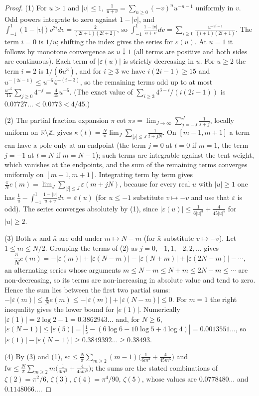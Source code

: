 \documentclass[11pt]{amsart}
\theoremstyle{definition}
\theoremstyle{remark}
\newcommand{\Z}{\mathbb{Z}}
\newcommand{\R}{\mathbb{R}}
\newcommand{\kb}{\bar\kappa}
\newcommand{\sprod}{\mathrm{sc}}
\newcommand{\fw}{\mathrm{fw}}
\begin{document}
\begin{proof}
(1) For $u>1$ and $|v|\le1$, $\frac1{u+v}=\sum_{n\ge0}(-v)^nu^{-n-1}$ uniformly in $v$. Odd powers integrate to zero
against $1-|v|$, and $\int_{-1}^1(1-|v|)v^{2i}dv=\frac2{(2i+1)(2i+2)}$, so
$\int_{-1}^1\frac{1-|v|}{u+v}dv=\sum_{i\ge0}\frac{u^{-2i-1}}{(i+1)(2i+1)}$. The term $i=0$ is $1/u$; shifting the index
gives the series for $\varepsilon(u)$. At $u=1$ it follows by monotone convergence as $u\downarrow1$ (all terms are
positive and both sides are continuous). Each term of $|\varepsilon(u)|$ is strictly decreasing in $u$. For $u\ge2$
the term $i=2$ is $1/(6u^3)$, and for $i\ge3$ we have $i(2i-1)\ge15$ and $u^{-(2i-1)}\le u^{-5}4^{-(i-3)}$, so the
remaining terms add up to at most $\frac{u^{-5}}{15}\sum_{j\ge0}4^{-j}=\frac{4}{45}u^{-5}$. (The exact value of
$\sum_{i\ge3}4^{3-i}/(i(2i-1))$ is $0.07727\ldots<0.0773<4/45$.)

(2) The partial fraction expansion $\pi\cot\pi s=\lim_{J\to\infty}\sum_{j=-J}^J\frac1{s+j}$, locally uniform on
$\R\setminus\Z$, gives $\kappa(t)=\frac N\pi\lim_J\sum_{|j|\le J}\frac1{t+jN}$. On $[m-1,m+1]$ a term can have a pole
only at an endpoint (the term $j=0$ at $t=0$ if $m=1$, the term $j=-1$ at $t=N$ if $m=N-1$); such terms are
integrable against the tent weight, which vanishes at the endpoints, and the sum of the remaining terms converges
uniformly on $[m-1,m+1]$. Integrating term by term gives $\frac\pi Ne(m)=\lim_J\sum_{|j|\le J}\varepsilon(m+jN)$, because for every real $u$ with $|u|\ge1$ one has
$\frac1u-\int_{-1}^1\frac{1-|v|}{u+v}dv=\varepsilon(u)$ (for $u\le-1$ substitute $v\mapsto-v$ and use that $\varepsilon$ is odd).
The series converges absolutely by (1), since $|\varepsilon(u)|\le\frac1{6|u|^3}+\frac4{45|u|^5}$ for $|u|\ge2$.

(3) Both $\kappa$ and $\kb$ are odd under $m\mapsto N-m$ (for $\kb$ substitute $v\mapsto-v$). Let $1\le m\le N/2$. Grouping the
terms of (2) as $j=0,-1,1,-2,2,\dots$ gives
\[
\frac\pi Ne(m)=-|\varepsilon(m)|+|\varepsilon(N-m)|-|\varepsilon(N+m)|+|\varepsilon(2N-m)|-\cdots,
\]
an alternating series whose arguments $m\le N-m\le N+m\le2N-m\le\cdots$ are non-decreasing, so its terms are
non-increasing in absolute value and tend to zero. Hence the sum lies between the first two partial sums:
$-|\varepsilon(m)|\le\frac\pi Ne(m)\le-|\varepsilon(m)|+|\varepsilon(N-m)|\le0$. For $m=1$ the right inequality gives the
lower bound for $|e(1)|$. Numerically $|\varepsilon(1)|=2\log2-1=0.3862943\ldots$ and, for $N\ge6$,
$|\varepsilon(N-1)|\le|\varepsilon(5)|=|\tfrac15-(6\log6-10\log5+4\log4)|=0.0013551\ldots$, so
$|\varepsilon(1)|-|\varepsilon(N-1)|\ge0.3849392\ldots\ge0.38493$.

(4) By (3) and (1), $\sprod\le\frac N\pi\sum_{m\ge2}(m-1)\bigl(\frac1{6m^3}+\frac4{45m^5}\bigr)$ and
$\fw\le\frac N\pi\sum_{m\ge2}m\bigl(\frac1{6m^3}+\frac4{45m^5}\bigr)$; the sums are the stated combinations of
$\zeta(2)=\pi^2/6$, $\zeta(3)$, $\zeta(4)=\pi^4/90$, $\zeta(5)$, whose values are $0.0778480\ldots$ and
$0.1148066\ldots$.
\end{proof}
\end{document}
